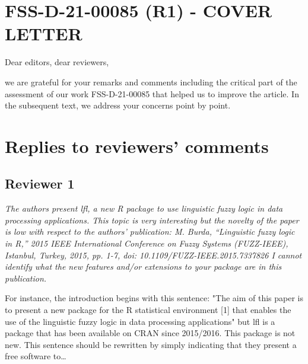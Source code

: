 \documentclass{article}
\begin{document}
\section*{FSS-D-21-00085 (R1) - COVER LETTER}


Dear editors, dear reviewers, 

we are grateful for your remarks and comments including the critical part of the assessment of our work FSS-D-21-00085 that helped us to improve the article. In the subsequent text, we address your concerns point by point.

\section{Replies to reviewers' comments}

\subsection{Reviewer 1}

{\it The authors present lfl, a new R package to use linguistic fuzzy logic in data processing applications. This topic is very interesting but the novelty of the paper is low with respect to the authors' publication:
M. Burda, ``Linguistic fuzzy logic in R,'' 2015 IEEE International Conference on Fuzzy Systems (FUZZ-IEEE), Istanbul, Turkey, 2015, pp. 1-7, doi: 10.1109/FUZZ-IEEE.2015.7337826
I cannot identify what the new features and/or extensions to your package are in this publication.

 For instance, the introduction begins with this sentence: "The aim of this paper is to present a new package for the R statistical environment [1] that enables the use of the linguistic fuzzy logic in data processing applications" but lfl is a package that has been available on CRAN since 2015/2016. This package is not new. This sentence should be rewritten by simply indicating that they present a free software to\ldots }
\end{document}
